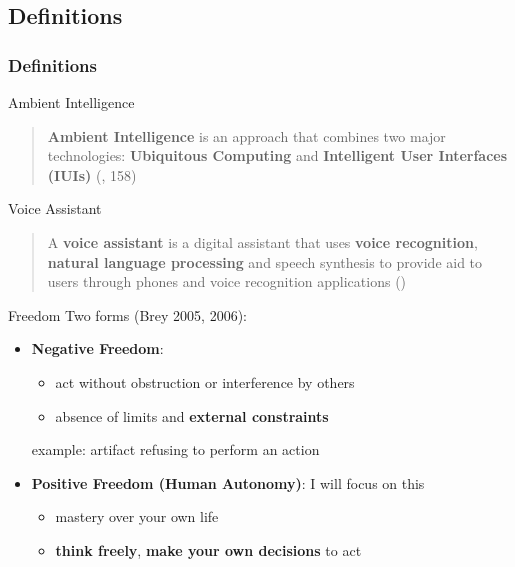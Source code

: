\documentclass{beamer}
\begin{document}
\subsection{Definitions}
\begin{frame}[allowframebreaks]
\frametitle{Definitions}	
	\begin{block}{Ambient Intelligence}
		\begin{quote}
			\textbf{Ambient Intelligence} is an approach that combines two major technologies: \textbf{Ubiquitous Computing} and \textbf{Intelligent User Interfaces (IUIs)} (\cite{brey2005freedom}, 158)
		\end{quote}
	\end{block}

	\begin{block}{Voice Assistant}
		\begin{quote}
			A \textbf{voice assistant} is a digital assistant that uses \textbf{voice recognition}, \textbf{natural language processing} and speech synthesis to provide aid to users through phones and voice recognition applications (\cite{whatis})
		\end{quote}
	\end{block}
	\framebreak
	\begin{block}{Freedom}
		   Two forms (Brey 2005, 2006):
		   
			\begin{itemize}
				\item \textbf{Negative Freedom}:
					\begin{itemize}
						\item act without obstruction or interference by others
						\item absence of limits and \textbf{external constraints}
					\end{itemize}
				\smallskip
				example: artifact refusing to perform an action
				    \bigskip
					\item {\small \textbf{Positive Freedom (Human Autonomy)}: I will focus on this}
						\begin{itemize}
							\item mastery over your own life
							\item \textbf{think freely}, \textbf{make your own decisions} to act
						\end{itemize}
			\end{itemize}
			
	\end{block}
\end{frame}
\end{document}

